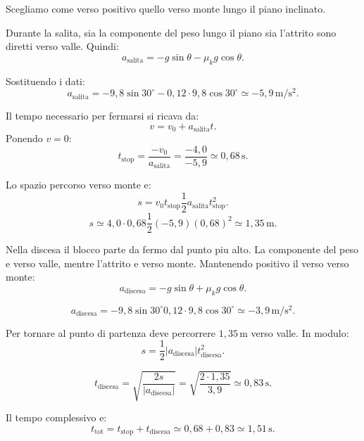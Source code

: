 \begin{soluzione}
Scegliamo come verso positivo quello verso monte lungo il piano inclinato.

Durante la salita, sia la componente del peso lungo il piano sia l'attrito sono
diretti verso valle. Quindi:
\[
a_\text{salita}
=-g\sin\theta-\mu_k g\cos\theta.
\]

Sostituendo i dati:
\[
a_\text{salita}
=-9{,}8\sin 30^\circ
-0{,}12\cdot 9{,}8\cos 30^\circ
\simeq -5{,}9\,\mathrm{m/s^2}.
\]

Il tempo necessario per fermarsi si ricava da:
\[
v=v_0+a_\text{salita}t.
\]
Ponendo \(v=0\):
\[
t_\text{stop}=\frac{-v_0}{a_\text{salita}}
=\frac{-4{,}0}{-5{,}9}
\simeq 0{,}68\,\mathrm{s}.
\]

Lo spazio percorso verso monte e:
\[
s=v_0t_\text{stop}
\frac{1}{2}a_\text{salita}t_\text{stop}^2.
\]
\[
s\simeq 4{,}0\cdot 0{,}68
\frac{1}{2}(-5{,}9)(0{,}68)^2
\simeq 1{,}35\,\mathrm{m}.
\]

Nella discesa il blocco parte da fermo dal punto piu alto. La componente del
peso e verso valle, mentre l'attrito e verso monte. Mantenendo positivo il
verso verso monte:
\[
a_\text{discesa}
=-g\sin\theta+\mu_k g\cos\theta.
\]

\[
a_\text{discesa}
=-9{,}8\sin 30^\circ
0{,}12\cdot 9{,}8\cos 30^\circ
\simeq -3{,}9\,\mathrm{m/s^2}.
\]

Per tornare al punto di partenza deve percorrere \(1{,}35\,\mathrm{m}\) verso
valle. In modulo:
\[
s=\frac{1}{2}|a_\text{discesa}|t_\text{discesa}^2.
\]

\[
t_\text{discesa}
=\sqrt{\frac{2s}{|a_\text{discesa}|}}
=\sqrt{\frac{2\cdot 1{,}35}{3{,}9}}
\simeq 0{,}83\,\mathrm{s}.
\]

Il tempo complessivo e:
\[
t_\text{tot}=t_\text{stop}+t_\text{discesa}
\simeq 0{,}68+0{,}83
\simeq 1{,}51\,\mathrm{s}.
\]
\end{soluzione}
